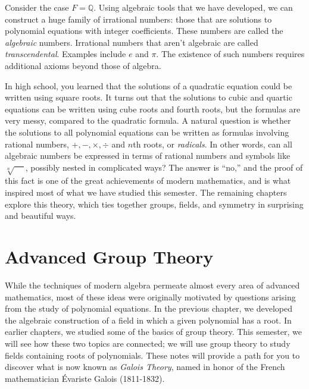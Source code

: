 Consider the case \(F = \mathbb{Q}\). Using algebraic tools that we have developed, we can construct a huge family of irrational numbers: those that are solutions to polynomial equations with integer coefficients. These numbers are called the \textit{algebraic} numbers. Irrational numbers that aren't algebraic are called \textit{transcendental}. Examples include \(e\) and \(\pi\). The existence of such numbers requires additional axioms beyond those of algebra.

In high school, you learned that the solutions of a quadratic equation could be written using square roots. It turns out that the solutions to cubic and quartic equations can be written using cube roots and fourth roots, but the formulas are very messy, compared to the quadratic formula. A natural question is whether the solutions to all polynomial equations can be written as formulas involving rational numbers, $+,-,\times,\div$ and $n$th roots, or \textit{radicals}. In other words, can all algebraic numbers be expressed in terms of rational numbers and symbols like \(\sqrt[n]{\phantom{xx}}\), possibly nested in complicated ways? The answer is ``no,'' and the proof of this fact is one of the great achievements of modern mathematics, and is what inspired most of what we have studied this semester. The remaining chapters explore this theory, which ties together groups, fields, and symmetry in surprising and beautiful ways.
\begin{annotation}
\end{annotation}


\chapter{Advanced Group Theory}\label{chap:advancedgps}

While the techniques of modern algebra permeate almost every area of advanced mathematics, most of these ideas were originally motivated by questions arising from the study of polynomial equations. In the previous chapter, we developed the algebraic construction of a field in which a given polynomial has a root. In earlier chapters, we studied some of the basics of group theory. This semester, we will see how these two topics are connected; we will use group theory to study fields containing roots of polynomials. These notes will provide a path for you to discover what is now known as \textit{Galois Theory}, named in honor of the French mathematician \'{E}variste Galois (1811-1832).
\begin{annotation}
\end{annotation}

